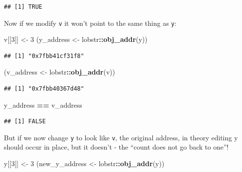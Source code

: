 \documentclass[]{book}
\newenvironment{Shaded}{\begin{snugshade}}{\end{snugshade}}
\newcommand{\DecValTok}[1]{\textcolor[rgb]{0.00,0.00,0.81}{#1}}
\newcommand{\KeywordTok}[1]{\textcolor[rgb]{0.13,0.29,0.53}{\textbf{#1}}}
\newcommand{\NormalTok}[1]{#1}
\newcommand{\OperatorTok}[1]{\textcolor[rgb]{0.81,0.36,0.00}{\textbf{#1}}}
\newcommand{\StringTok}[1]{\textcolor[rgb]{0.31,0.60,0.02}{#1}}
\begin{document}
\begin{verbatim}
## [1] TRUE
\end{verbatim}

Now if we modify \texttt{v} it won't point to the same thing as \texttt{y}:

\begin{Shaded}
\begin{Highlighting}[]
\NormalTok{v[[}\DecValTok{3}\NormalTok{]] <-}\StringTok{ }\DecValTok{3}
\NormalTok{(y_address <-}\StringTok{ }\NormalTok{lobstr}\OperatorTok{::}\KeywordTok{obj_addr}\NormalTok{(y))}
\end{Highlighting}
\end{Shaded}

\begin{verbatim}
## [1] "0x7fbb41cf31f8"
\end{verbatim}

\begin{Shaded}
\begin{Highlighting}[]
\NormalTok{(v_address <-}\StringTok{ }\NormalTok{lobstr}\OperatorTok{::}\KeywordTok{obj_addr}\NormalTok{(v))}
\end{Highlighting}
\end{Shaded}

\begin{verbatim}
## [1] "0x7fbb40367d48"
\end{verbatim}

\begin{Shaded}
\begin{Highlighting}[]
\NormalTok{y_address }\OperatorTok{==}\StringTok{ }\NormalTok{v_address}
\end{Highlighting}
\end{Shaded}

\begin{verbatim}
## [1] FALSE
\end{verbatim}

But if we now change \texttt{y} to look like \texttt{v}, the original address, in theory editing y should occur in place, but it doesn't - the ``count does not go back to one''!

\begin{Shaded}
\begin{Highlighting}[]
\NormalTok{y[[}\DecValTok{3}\NormalTok{]] <-}\StringTok{ }\DecValTok{3}
\NormalTok{(new_y_address <-}\StringTok{ }\NormalTok{lobstr}\OperatorTok{::}\KeywordTok{obj_addr}\NormalTok{(y))}
\end{Highlighting}
\end{Shaded}
\end{document}
